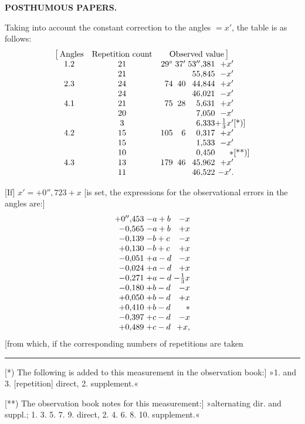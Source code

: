 \par\clearpage
\noindent{}\hfill{\small\textbf{POSTHUMOUS PAPERS.}}\hfill\null\par\medskip

Taking into account the constant correction to the angles \(=x'\), the table is as follows:
\[
\begin{array}{@{}c@{\quad}c@{\quad}r@{\;}r@{\;}r@{}r@{}l@{}}
 \bigl[\,\text{Angles}&\text{Repetition count}&
 \multicolumn{4}{c@{}}{\text{Observed value}\,\bigr]}&\\
 1.2&21&29^\circ&37'&53''{,}381&+x'&\\
 &21&&&55{,}845&-x'&\\
 2.3&24&74&40&44{,}844&+x'&\\
 &24&&&46{,}021&-x'&\\
 4.1&21&75&28&5{,}631&+x'&\\
 &20&&&7{,}050&-x'&\\
 &3&&&6{,}333&+\frac13x'&\text{[*)]}\\
 4.2&15&105&6&0{,}317&+x'&\\
 &15&&&1{,}533&-x'&\\
 &10&&&0{,}450&\ast&\text{[**)]}\\
 4.3&13&179&46&45{,}962&+x'&\\
 &11&&&46{,}522&-x'.&
\end{array}
\]

[If] \(x'=+0''{,}723+x\) [is set, the expressions for the observational errors in the angles are:]
\[
\begin{array}{@{}r@{\;}l@{\;}r@{}}
 +0''{,}453&-a+b&-x\\
 -0{,}565&-a+b&+x\\
 -0{,}139&-b+c&-x\\
 +0{,}130&-b+c&+x\\
 -0{,}051&+a-d&-x\\
 -0{,}024&+a-d&+x\\
 -0{,}271&+a-d&-\frac13x\\
 -0{,}180&+b-d&-x\\
 +0{,}050&+b-d&+x\\
 +0{,}410&+b-d&\ast\\
 -0{,}397&+c-d&-x\\
 +0{,}489&+c-d&+x,
\end{array}
\]
\noindent [from which, if the corresponding numbers of repetitions are taken

\par\noindent\rule{4cm}{.4pt}\par
{\footnotesize
\noindent\hspace*{\parindent}[*) The following is added to this measurement in the observation book:] »1. and 3. [repetition] direct, 2. supplement.«\par
\noindent\hspace*{\parindent}[**) The observation book notes for this measurement:] »alternating dir. and suppl.; 1. 3. 5. 7. 9. direct, 2. 4. 6. 8. 10. supplement.«\par}

